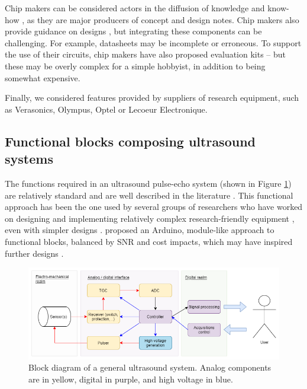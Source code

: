 \documentclass{article}
\begin{document}
Chip makers can be considered actors in the diffusion of knowledge and know-how \cite{brunner_how_2002, xu_challenges_2010}, as they are major producers of concept and design notes. Chip makers also provide guidance on designs \cite{ching_chu_designing_nodate}, but integrating these components can be challenging. For example, datasheets may be incomplete or erroneous. To support the use of their circuits, chip makers have also proposed evaluation kits -- but these may be overly complex for a simple hobbyist, in addition to being somewhat expensive.

Finally, we considered features provided by suppliers of research equipment, such as Verasonics, Olympus, Optel or Lecoeur Electronique. 


\subsection{Functional blocks composing ultrasound systems}

The functions required in an ultrasound pulse-echo system (shown in Figure \ref{fig:BlockDiagramme}) are relatively standard and are well described in the literature \cite{murtaza_ali_signal_2008}. This functional approach has been the one used by several groups of researchers who have worked on designing and implementing relatively complex research-friendly equipment \cite{boni_ula-op_2016, boni_reconfigurable_2012, boni_ultrasound_2018, qiu_flexible_2012, levesque_architecture_2011}, even with simpler designs  \cite{carotenuto_fast_2005,richard_low-cost_2008,taylor_development_2017}. \cite{jonveaux_arduino-like_2017} proposed an Arduino, module-like approach to functional blocks, balanced by SNR and cost impacts, which may have inspired further designs \cite{golabek_construction_2019}.

\begin{figure}[H]
 \includegraphics[width=\linewidth]{Fig1.png}
 \caption{Block diagram of a general ultrasound system. Analog components are in yellow, digital in purple, and high voltage in blue.}
 \label{fig:BlockDiagramme}
\end{figure}
\end{document}
